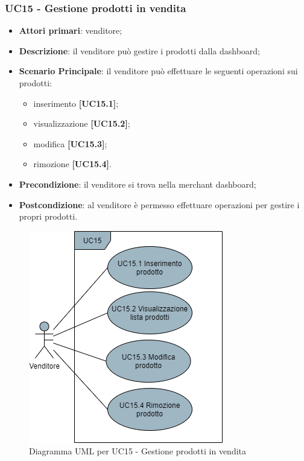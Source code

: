 \subsubsection{UC15 - Gestione prodotti in vendita}
\begin{itemize}
\item \textbf{Attori primari}: venditore;
\item \textbf{Descrizione}: il venditore può gestire i prodotti dalla dashboard;
\item \textbf{Scenario Principale}: il venditore può effettuare le seguenti operazioni sui prodotti:
\begin{itemize}
	\item inserimento \textbf{[UC15.1]};
	\item visualizzazione \textbf{[UC15.2]};
	\item modifica \textbf{[UC15.3]};
	\item rimozione \textbf{[UC15.4]}.
\end{itemize}
\item \textbf{Precondizione}: il venditore si trova nella merchant dashboard;
\item \textbf{Postcondizione}: al venditore è permesso effettuare operazioni per gestire i propri prodotti.
\end{itemize}

\begin{figure}[H]
\centering
\includegraphics[scale=0.6]{res/UseCase/Immagini/GestioneProdotti}
\caption{Diagramma UML per UC15 - Gestione prodotti in vendita}
\end{figure}

